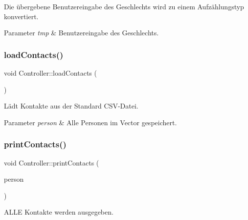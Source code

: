 Die übergebene Benutzereingabe des Geschlechts wird zu einem Aufzählungstyp konvertiert.


\begin{DoxyParams}{Parameter}
{\em tmp} & Benutzereingabe des Geschlechts.\\
\hline
\end{DoxyParams}
\mbox{\label{classContactManager_1_1Controller_a5b020c2e4726dc2e50fc14b4ac53b3d9}} 
\subsubsection{\texorpdfstring{load\+Contacts()}{loadContacts()}}
{\footnotesize\ttfamily void Controller\+::load\+Contacts (\begin{DoxyParamCaption}{ }\end{DoxyParamCaption})}



Lädt Kontakte aus der Standard C\+S\+V-\/\+Datei.


\begin{DoxyParams}{Parameter}
{\em person} & Alle Personen im Vector gespeichert.\\
\hline
\end{DoxyParams}
\mbox{\label{classContactManager_1_1Controller_abd46b513b9d71e896fa3187e616aa805}} 
\subsubsection{\texorpdfstring{print\+Contacts()}{printContacts()}}
{\footnotesize\ttfamily void Controller\+::print\+Contacts (\begin{DoxyParamCaption}\item[{vector$<$ \hyperlink{classContactManager_1_1Person}{Person} $>$ \&}]{person }\end{DoxyParamCaption})}



A\+L\+LE Kontakte werden ausgegeben.


